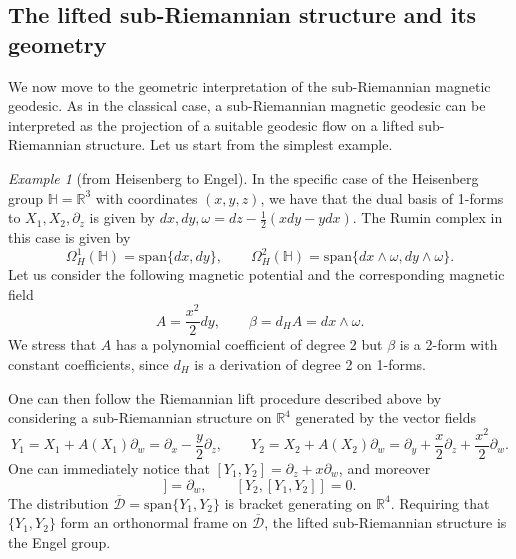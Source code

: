 \documentclass{amsart}
\theoremstyle{plain}
\theoremstyle{definition}
\theoremstyle{remark}
\newtheorem{example}[thm]{Example}
\newcommand{\R}{\mathbb{R}}
\newcommand{\diff}{d}%
\newcommand{\p}{\partial}												%
\newcommand{\sr}{sub-{R}ie\-man\-nian }
\newcommand{\distr}{\mathcal{D}}								%
\newcommand{\B}{\beta}
\newcommand{\lift}[1]{\overline{#1}} 							%
\begin{document}
\subsection{The lifted \sr structure and its geometry}
We now move to the geometric interpretation of the sub-Riemannian magnetic geodesic. As in the classical case, a \sr magnetic geodesic can be interpreted as the projection of a suitable geodesic flow on a lifted \sr structure.
Let us start from the simplest example.
\begin{example}[from Heisenberg to Engel]
\label{ex:fromHtoEintro}
In the specific case of the Heisenberg group  $\mathbb H=\R^3$ with coordinates $(x,y,z)$, we have that the dual basis of 1-forms to $X_{1},X_{2},\partial_{z}$ is given by $dx,dy,\omega=dz-\frac{1}{2}(xdy-ydx)$. The Rumin complex in this case is given by
\begin{equation}
\Omega^1_H(\mathbb{H})=\mathrm{span}\{dx,dy\},
\qquad
\Omega^2_H(\mathbb{H})=\mathrm{span}\{dx\wedge\omega,dy\wedge\omega\}.
\end{equation}
Let us consider the following magnetic potential and the corresponding magnetic field
\begin{equation}
A=\frac{x^2}{2}dy, \qquad \B=\diff_{H}A=dx\wedge\omega .
\end{equation}
We stress that $A$ has a polynomial coefficient of degree 2 but $\beta$ is a 2-form with constant coefficients, since $\diff_{H}$ is a derivation of degree 2 on 1-forms.

One can then follow the Riemannian lift procedure described above by considering a \sr structure on $\R^4$ generated by the vector fields
\begin{equation}
Y_1=X_1+A(X_1)\p_w=\p_x-\dfrac{y}{2}\p _z,\qquad Y_2=X_2+A(X_2)\p_w=\p _y+\dfrac{x}{2}\p _z+\frac{x^2}{2}\p_w.
\end{equation} 
One can immediately notice that $[Y_1,Y_2]=\p_z+x\p_w$,  
and moreover
\begin{equation}
[Y_1,[Y_1,Y_2]]=\p_w, \qquad [Y_2,[Y_1,Y_2]]=0.
\end{equation}
The distribution $\lift\distr=\mathrm{span}\{Y_1,Y_2\}$ is bracket generating on $\R^4$. Requiring that $\{Y_1,Y_2\}$ form an orthonormal frame on $\lift\distr$, the lifted \sr structure is the Engel group. 
\end{example}
\end{document}
